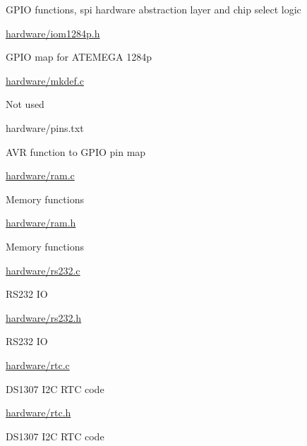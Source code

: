 \begin{DoxyItemize}
\begin{DoxyItemize}
\begin{DoxyItemize}
\item G\+P\+IO functions, spi hardware abstraction layer and chip select logic
\end{DoxyItemize}
\item \hyperlink{iom1284p_8h}{hardware/iom1284p.\+h}
\begin{DoxyItemize}
\item G\+P\+IO map for A\+T\+E\+M\+E\+GA 1284p
\end{DoxyItemize}
\item \hyperlink{mkdef_8c}{hardware/mkdef.\+c}
\begin{DoxyItemize}
\item Not used
\end{DoxyItemize}
\item hardware/pins.\+txt
\begin{DoxyItemize}
\item A\+VR function to G\+P\+IO pin map
\end{DoxyItemize}
\item \hyperlink{ram_8c}{hardware/ram.\+c}
\begin{DoxyItemize}
\item Memory functions
\end{DoxyItemize}
\item \hyperlink{ram_8h}{hardware/ram.\+h}
\begin{DoxyItemize}
\item Memory functions
\end{DoxyItemize}
\item \hyperlink{rs232_8c}{hardware/rs232.\+c}
\begin{DoxyItemize}
\item R\+S232 IO
\end{DoxyItemize}
\item \hyperlink{rs232_8h}{hardware/rs232.\+h}
\begin{DoxyItemize}
\item R\+S232 IO
\end{DoxyItemize}
\item \hyperlink{rtc_8c}{hardware/rtc.\+c}
\begin{DoxyItemize}
\item D\+S1307 I2C R\+TC code
\end{DoxyItemize}
\item \hyperlink{rtc_8h}{hardware/rtc.\+h}
\begin{DoxyItemize}
\item D\+S1307 I2C R\+TC code
\end{DoxyItemize}

\end{DoxyItemize}
\end{DoxyItemize}
